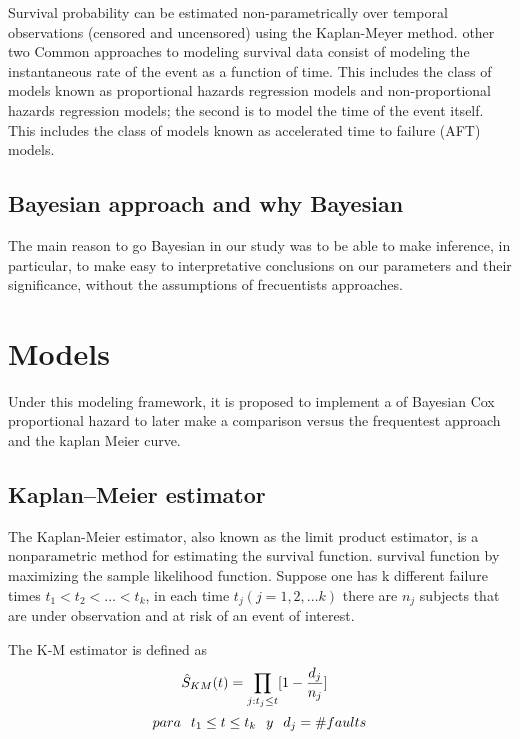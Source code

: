 \documentclass[
  twocolumn]{article}
\begin{document}
Survival probability can be estimated non-parametrically over temporal
observations (censored and uncensored) using the Kaplan-Meyer method.
other two Common approaches to modeling survival data consist of
modeling the instantaneous rate of the event as a function of time. This
includes the class of models known as proportional hazards regression
models and non-proportional hazards regression models; the second is to
model the time of the event itself. This includes the class of models
known as accelerated time to failure (AFT) models.

\hypertarget{bayesian-approach-and-why-bayesian}{%
\subsection{Bayesian approach and why
Bayesian}\label{bayesian-approach-and-why-bayesian}}

The main reason to go Bayesian in our study was to be able to make
inference, in particular, to make easy to interpretative conclusions on
our parameters and their significance, without the assumptions of
frecuentists approaches.

\hypertarget{models}{%
\section{Models}\label{models}}

Under this modeling framework, it is proposed to implement a of Bayesian
Cox proportional hazard to later make a comparison versus the
frequentest approach and the kaplan Meier curve.

\hypertarget{kaplanmeier-estimator}{%
\subsection{Kaplan--Meier estimator}\label{kaplanmeier-estimator}}

The Kaplan-Meier estimator, also known as the limit product estimator,
is a nonparametric method for estimating the survival function. survival
function by maximizing the sample likelihood function. Suppose one has k
different failure times \(t_1<t_2<...<t_k\), in each time
\(t_j(j=1,2,...k)\) there are \(n_j\) subjects that are under
observation and at risk of an event of interest.

The K-M estimator is defined as
\[\hat S_{KM}(t)=\prod_{j:t_j\leq t}^{}[1-\frac{d_j}{n_j}]\hspace{2.5mm}\]\[para\hspace{2.5mm}t_1\leq t\leq t_k\hspace{2.5mm}y\hspace{2.5mm}d_j=\#faults\]
\end{document}
